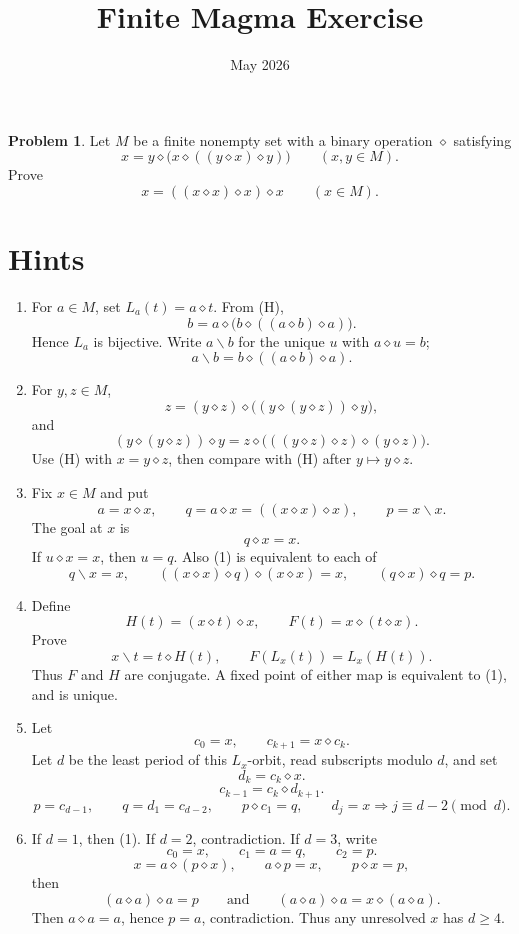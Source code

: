 \documentclass[12pt]{article}
\title{Finite Magma Exercise}
\author{}
\date{May 2026}
\newcommand{\op}{\diamond}
\theoremstyle{definition}
\newtheorem{problem}{Problem}
\begin{document}
\maketitle

\begin{problem}
Let $M$ be a finite nonempty set with a binary operation $\op$ satisfying
\[
x=y\op\bigl(x\op((y\op x)\op y)\bigr)
\qquad (x,y\in M). \tag{H}
\]
Prove
\[
x=((x\op x)\op x)\op x
\qquad (x\in M). \tag{G}
\]
\end{problem}

\section*{Hints}

\begin{enumerate}[label=\textbf{\arabic*.}]
\item For $a\in M$, set $L_a(t)=a\op t$.  From (H),
\[
b=a\op\bigl(b\op((a\op b)\op a)\bigr).
\]
Hence $L_a$ is bijective.  Write $a\backslash b$ for the unique $u$ with $a\op u=b$;
\[
a\backslash b=b\op((a\op b)\op a). \tag{D}
\]

\item For $y,z\in M$,
\[
z=(y\op z)\op\bigl((y\op(y\op z))\op y\bigr), \tag{T}
\]
and
\[
(y\op(y\op z))\op y
=z\op\bigl(((y\op z)\op z)\op(y\op z)\bigr). \tag{K}
\]
Use (H) with $x=y\op z$, then compare with (H) after $y\mapsto y\op z$.

\item Fix $x\in M$ and put
\[
a=x\op x,
\qquad
q=a\op x=((x\op x)\op x),
\qquad
p=x\backslash x.
\]
The goal at $x$ is
\[
q\op x=x. \tag{1}
\]
If $u\op x=x$, then $u=q$.  Also (1) is equivalent to each of
\[
q\backslash x=x,
\qquad
((x\op x)\op q)\op(x\op x)=x,
\qquad
(q\op x)\op q=p. \tag{2}
\]

\item Define
\[
H(t)=(x\op t)\op x,
\qquad
F(t)=x\op(t\op x).
\]
Prove
\[
x\backslash t=t\op H(t),
\qquad
F(L_x(t))=L_x(H(t)). \tag{3}
\]
Thus $F$ and $H$ are conjugate.  A fixed point of either map is equivalent to (1), and
is unique.

\item Let
\[
c_0=x,
\qquad
c_{k+1}=x\op c_k.
\]
Let $d$ be the least period of this $L_x$-orbit, read subscripts modulo $d$, and set
\[
d_k=c_k\op x.
\]
\[
c_{k-1}=c_k\op d_{k+1}. \tag{4}
\]
\[
p=c_{d-1},
\qquad
q=d_1=c_{d-2},
\qquad
p\op c_1=q,
\qquad
d_j=x\Rightarrow j\equiv d-2\pmod d. \tag{5}
\]

\item If $d=1$, then (1).  If $d=2$, contradiction.  If $d=3$, write
\[
c_0=x,
\qquad
c_1=a=q,
\qquad
c_2=p.
\]
\[
x=a\op(p\op x),
\qquad
a\op p=x,
\qquad
p\op x=p,
\]
then
\[
(a\op a)\op a=p
\qquad\text{and}\qquad
(a\op a)\op a=x\op(a\op a).
\]
Then $a\op a=a$, hence $p=a$, contradiction.  Thus any unresolved $x$ has $d\ge4$.


\end{enumerate}
\end{document}
